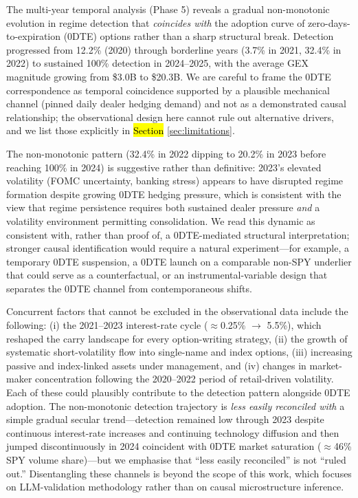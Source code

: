 \documentclass[jrfm,article,accept,moreauthors,pdftex]{Definitions/mdpi}
\begin{document}
The multi-year temporal analysis (Phase 5) reveals a gradual non-monotonic evolution in regime detection that \textit{coincides with} the adoption curve of zero-days-to-expiration (0DTE) options rather than a sharp structural break. Detection progressed from 12.2\% (2020) through borderline years (3.7\% in 2021, 32.4\% in 2022) to sustained 100\% detection in \mbox{2024--2025}, with the average GEX magnitude growing from \$3.0B to \$20.3B. We are careful to frame the 0DTE correspondence as temporal coincidence supported by a plausible mechanical channel (pinned daily dealer hedging demand) and not as a demonstrated causal relationship; the observational design here cannot rule out alternative drivers, and we list those explicitly in \hl{Section} \ref{sec:limitations}.%


The non-monotonic pattern (32.4\% in 2022 dipping to 20.2\% in 2023 before reaching 100\% in 2024) is suggestive rather than definitive: 2023's elevated volatility (FOMC uncertainty, banking stress) appears to have disrupted regime formation despite growing 0DTE hedging pressure, which is consistent with the view that regime persistence requires both sustained dealer pressure \textit{and} a volatility environment permitting consolidation. We read this dynamic as consistent with, rather than proof of, a 0DTE-mediated structural interpretation; stronger causal identification would require a natural experiment---for example, a temporary 0DTE suspension, a 0DTE launch on a comparable non-SPY underlier that could serve as a counterfactual, or an instrumental-variable design that separates the 0DTE channel from contemporaneous shifts.

Concurrent factors that cannot be excluded in the observational data include the following: (i) the 2021--2023 interest-rate cycle ($\approx$0.25\% $\rightarrow$ 5.5\%), which reshaped the carry landscape for every option-writing strategy, (ii) the growth of systematic short-volatility flow into single-name and index options, (iii) increasing passive and index-linked assets under management, and (iv) changes in market-maker concentration following the 2020--2022 period of retail-driven volatility. Each of these could plausibly contribute to the detection pattern alongside 0DTE adoption. The non-monotonic detection trajectory is \textit{less easily reconciled with} a simple gradual secular trend---detection remained low through 2023 despite continuous interest-rate increases and continuing technology diffusion and then jumped discontinuously in 2024 coincident with 0DTE market saturation ($\approx$46\% SPY volume share)---but we emphasise that ``less easily reconciled'' is not ``ruled out.'' Disentangling these channels is beyond the scope of this work, which focuses on LLM-validation methodology rather than on causal microstructure inference.
\end{document}
